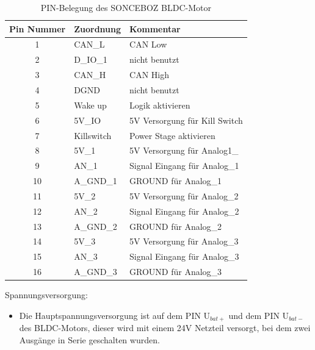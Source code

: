\begin{table}[ht]
    \begin{center}
    \begin{tabular}{|c | l | l|} 
        \hline
        Pin Nummer & Zuordnung & Kommentar\\
        \hline
        1 & CAN\_L & CAN Low\\
        \hline
        2 & D\_IO\_1 & nicht benutzt \\
        \hline
        3 & CAN\_H & CAN High\\
        \hline
        4 & DGND & nicht benutzt\\
        \hline
        5 & Wake up & Logik aktivieren\\
        \hline
        6 & 5V\_IO & 5V Versorgung für Kill Switch\\
        \hline
        7 & Killswitch & Power Stage aktivieren\\
        \hline
        8 & 5V\_1 & 5V Versorgung für Analog1\_\\
        \hline 
        9 & AN\_1 & Signal Eingang für Analog\_1\\
        \hline 
        10 & A\_GND\_1 & GROUND für Analog\_1\\ 
        \hline
        11 & 5V\_2 & 5V Versorgung für Analog\_2\\
        \hline 
        12 & AN\_2 & Signal Eingang für Analog\_2\\
        \hline  
        13 & A\_GND\_2 & GROUND für Analog\_2\\
        \hline
        14 & 5V\_3 & 5V Versorgung für Analog\_3\\
        \hline 
        15 & AN\_3 & Signal Eingang für Analog\_3\\
        \hline 
        16 & A\_GND\_3 & GROUND für Analog\_3\\
        \hline
    \end{tabular}

    \label{table::PIN-Belegung}
    
    \caption{PIN-Belegung des SONCEBOZ BLDC-Motor \cite{SONCEBOZ}}
\end{center}
\end{table}

Spannungsversorgung:
\begin{itemize}
    \item Die Hauptspannungsversorgung ist auf dem PIN U$_{bat+}$ und dem PIN U$_{bat-}$ des BLDC-Motors, dieser wird mit einem 24V Netzteil versorgt, bei dem zwei Ausgänge in Serie geschalten wurden.  \cite{SONCEBOZ}
\end{itemize}

